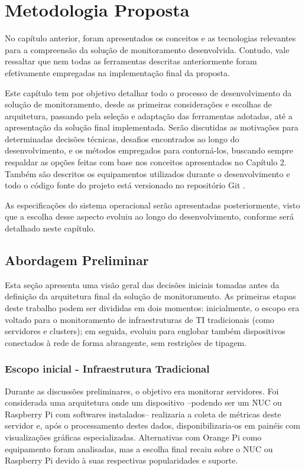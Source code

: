 \chapter{Metodologia Proposta}
\label{chap3}

No capítulo anterior, foram apresentados os conceitos e as tecnologias relevantes para a compreensão da solução de monitoramento desenvolvida. Contudo, vale ressaltar que nem todas as ferramentas descritas anteriormente foram efetivamente empregadas na implementação final da proposta.

Este capítulo tem por objetivo detalhar todo o processo de desenvolvimento da solução de monitoramento, desde as primeiras considerações e escolhas de arquitetura, passando pela seleção e adaptação das ferramentas adotadas, até a apresentação da solução final implementada. Serão discutidas as motivações para determinadas decisões técnicas, desafios encontrados ao longo do desenvolvimento, e os métodos empregados para contorná-los, buscando sempre respaldar as opções feitas com base nos conceitos apresentados no Capítulo 2. Também são descritos os equipamentos utilizados durante o desenvolvimento e todo o código fonte do projeto está versionado no repositório Git \citep{vitorcossetti2025}.

As especificações do sistema operacional serão apresentadas posteriormente, visto que a escolha desse aspecto evoluiu ao longo do desenvolvimento, conforme será detalhado neste capítulo.

\section{Abordagem Preliminar}
\label{section:AbordagemPreliminar}

Esta seção apresenta uma visão geral das decisões iniciais tomadas antes da definição da arquitetura final da solução de monitoramento. As primeiras etapas deste trabalho podem ser divididas em dois momentos: inicialmente, o escopo era voltado para o monitoramento de infraestruturas de TI tradicionais (como servidores e clusters); em seguida, evoluiu para englobar também dispositivos conectados à rede de forma abrangente, sem restrições de tipagem.

\subsection{Escopo inicial - Infraestrutura Tradicional}
\label{subsection:EscopoInicial}

Durante as discussões preliminares, o objetivo era monitorar servidores. Foi considerada uma arquitetura onde um dispositivo --podendo ser um NUC ou Raspberry Pi com softwares instalados-- realizaria a coleta de métricas deste servidor e, após o processamento destes dados, disponibilizaria-os em painéis com visualizações gráficas especializadas. Alternativas com Orange Pi como equipamento foram analisadas, mas a escolha final recaiu sobre o NUC ou Raspberry Pi devido à suas respectivas popularidades e suporte.

